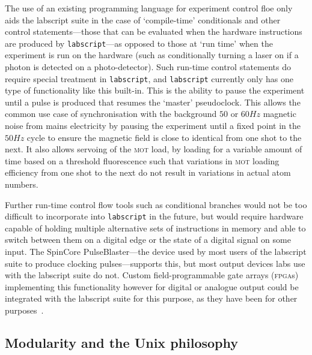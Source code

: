 The use of an existing programming language for experiment control floe only aids the labscript suite in the case of `compile-time' conditionals and other control statements---those that can be evaluated when the hardware instructions are produced by \texttt{labscript}---as opposed to those at `run time' when the experiment is run on the hardware (such as conditionally turning a laser on if a photon is detected on a photo-detector). Such run-time control statements do require special treatment in \texttt{labscript}, and \texttt{labscript} currently only has one type of functionality like this built-in. This is the ability to pause the experiment until a pulse is produced that resumes the `master' pseudoclock. This allows the common use case of synchronisation with the background $50$ or $60\unit{Hz}$ magnetic noise from mains electricity by pausing the experiment until a fixed point in the $50\unit{Hz}$ cycle to ensure the magnetic field is close to identical from one shot to the next. It also allows servoing of the \textsc{mot} load, by loading for a variable amount of time based on a threshold fluorescence such that variations in \textsc{mot} loading efficiency from one shot to the next do not result in variations in actual atom numbers.

Further run-time control flow tools such as conditional branches would not be too difficult to incorporate into \texttt{labscript} in the future, but would require hardware capable of holding multiple alternative sets of instructions in memory and able to switch between them on a digital edge or the state of a digital signal on some input. The SpinCore PulseBlaster---the device used by most users of the labscript suite to produce clocking pulses---supports this, but most output devices labs use with the labscript suite do not. Custom field-programmable gate arrays (\textsc{fpga}s) implementing this functionality however for digital or analogue output could be integrated with the labscript suite for this purpose, as they have been for other purposes~\cite{gill_optical_2016}.

\subsection{Modularity and the Unix philosophy}\label{sec:unix_philosophy}

